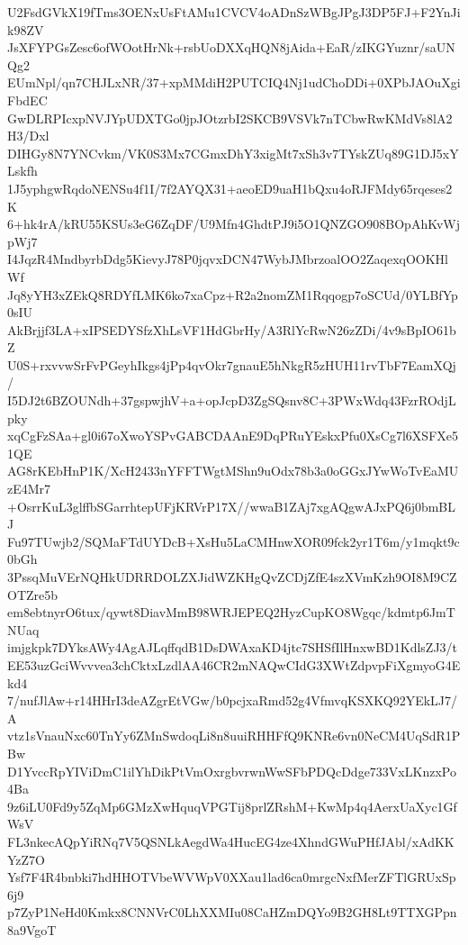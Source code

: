 U2FsdGVkX19fTms3OENxUsFtAMu1CVCV4oADnSzWBgJPgJ3DP5FJ+F2YnJik98ZV
JsXFYPGsZesc6ofWOotHrNk+rsbUoDXXqHQN8jAida+EaR/zIKGYuznr/saUNQg2
EUmNpl/qn7CHJLxNR/37+xpMMdiH2PUTCIQ4Nj1udChoDDi+0XPbJAOuXgiFbdEC
GwDLRPIcxpNVJYpUDXTGo0jpJOtzrbI2SKCB9VSVk7nTCbwRwKMdVs8lA2H3/Dxl
DIHGy8N7YNCvkm/VK0S3Mx7CGmxDhY3xigMt7xSh3v7TYskZUq89G1DJ5xYLskfh
1J5yphgwRqdoNENSu4f1I/7f2AYQX31+aeoED9uaH1bQxu4oRJFMdy65rqeses2K
6+hk4rA/kRU55KSUs3eG6ZqDF/U9Mfn4GhdtPJ9i5O1QNZGO908BOpAhKvWjpWj7
I4JqzR4MndbyrbDdg5KievyJ78P0jqvxDCN47WybJMbrzoalOO2ZaqexqOOKHlWf
Jq8yYH3xZEkQ8RDYfLMK6ko7xaCpz+R2a2nomZM1Rqqogp7oSCUd/0YLBfYp0sIU
AkBrjjf3LA+xIPSEDYSfzXhLsVF1HdGbrHy/A3RlYcRwN26zZDi/4v9sBpIO61bZ
U0S+rxvvwSrFvPGeyhIkgs4jPp4qvOkr7gnauE5hNkgR5zHUH11rvTbF7EamXQj/
I5DJ2t6BZOUNdh+37gspwjhV+a+opJcpD3ZgSQsnv8C+3PWxWdq43FzrROdjLpky
xqCgFzSAa+gl0i67oXwoYSPvGABCDAAnE9DqPRuYEskxPfu0XsCg7l6XSFXe51QE
AG8rKEbHnP1K/XcH2433nYFFTWgtMShn9uOdx78b3a0oGGxJYwWoTvEaMUzE4Mr7
+OsrrKuL3glffbSGarrhtepUFjKRVrP17X//wwaB1ZAj7xgAQgwAJxPQ6j0bmBLJ
Fu97TUwjb2/SQMaFTdUYDcB+XsHu5LaCMHnwXOR09fck2yr1T6m/y1mqkt9c0bGh
3PssqMuVErNQHkUDRRDOLZXJidWZKHgQvZCDjZfE4szXVmKzh9OI8M9CZOTZre5b
em8ebtnyrO6tux/qywt8DiavMmB98WRJEPEQ2HyzCupKO8Wgqc/kdmtp6JmTNUaq
imjgkpk7DYksAWy4AgAJLqffqdB1DsDWAxaKD4jtc7SHSfIlHnxwBD1KdlsZJ3/t
EE53uzGciWvvvea3chCktxLzdlAA46CR2mNAQwCIdG3XWtZdpvpFiXgmyoG4Ekd4
7/nufJlAw+r14HHrI3deAZgrEtVGw/b0pcjxaRmd52g4VfmvqKSXKQ92YEkLJ7/A
vtz1sVnauNxc60TnYy6ZMnSwdoqLi8n8uuiRHHFfQ9KNRe6vn0NeCM4UqSdR1PBw
D1YvccRpYIViDmC1ilYhDikPtVmOxrgbvrwnWwSFbPDQcDdge733VxLKnzxPo4Ba
9z6iLU0Fd9y5ZqMp6GMzXwHquqVPGTij8prlZRshM+KwMp4q4AerxUaXyc1GfWsV
FL3nkecAQpYiRNq7V5QSNLkAegdWa4HucEG4ze4XhndGWuPHfJAbl/xAdKKYzZ7O
Ysf7F4R4bnbki7hdHHOTVbeWVWpV0XXau1lad6ca0mrgcNxfMerZFTlGRUxSp6j9
p7ZyP1NeHd0Kmkx8CNNVrC0LhXXMIu08CaHZmDQYo9B2GH8Lt9TTXGPpn8a9VgoT

